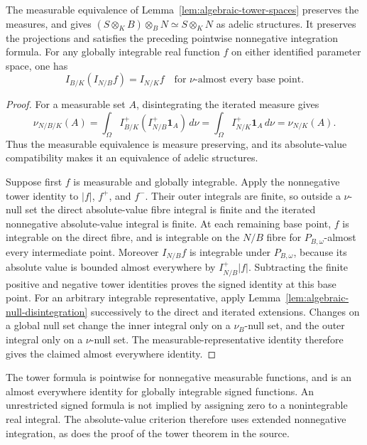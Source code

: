 \begin{theorem}\label{thm:algebraic-tower}
\leanok
{}
The measurable equivalence of Lemma~\ref{lem:algebraic-tower-spaces}
preserves the measures, and gives
$(S\otimes_K B)\otimes_B N\simeq S\otimes_K N$ as adelic structures.
It preserves the projections and satisfies the preceding pointwise
nonnegative integration formula. For any globally integrable real
function $f$ on either identified parameter space, one has
\[
 I_{B/K}(I_{N/B}f)=I_{N/K}f
 \quad\text{for }\nu\text{-almost every base point}.
\]
\end{theorem}
\begin{proof}
For a measurable set $A$, disintegrating the iterated measure gives
\[
 \nu_{N/B/K}(A)
 =\int_\Omega I^+_{B/K}(I^+_{N/B}\mathbf1_A)\,d\nu
 =\int_\Omega I^+_{N/K}\mathbf1_A\,d\nu=\nu_{N/K}(A).
\]
Thus the measurable equivalence is measure preserving, and its
absolute-value compatibility makes it an equivalence of adelic structures.

Suppose first $f$ is measurable and globally integrable. Apply the
nonnegative tower identity to $|f|$, $f^+$, and $f^-$. Their outer
integrals are finite, so outside a $\nu$-null set the direct
absolute-value fibre integral is finite and the iterated nonnegative
absolute-value integral is finite. At each remaining base point,
$f$ is integrable on the direct fibre, and is integrable on the
$N/B$ fibre for $P_{B,\omega}$-almost every intermediate point.
Moreover $I_{N/B}f$ is integrable under $P_{B,\omega}$, because its
absolute value is bounded almost everywhere by $I^+_{N/B}|f|$.
Subtracting the finite positive and negative tower identities proves
the signed identity at this base point.
For an arbitrary integrable representative, apply
Lemma~\ref{lem:algebraic-null-disintegration} successively to the
direct and iterated extensions. Changes on a global null set change
the inner integral only on a $\nu_B$-null set, and the outer integral
only on a $\nu$-null set. The measurable-representative identity
therefore gives the claimed almost everywhere identity.
\end{proof}

\begin{remark}\label{rem:signed-tower-domain}
The tower formula is pointwise for nonnegative measurable functions,
and is an almost everywhere identity for globally integrable signed
functions. An unrestricted signed formula is not implied by assigning
zero to a nonintegrable real integral. The absolute-value criterion
therefore uses extended nonnegative integration, as does the proof of
the tower theorem in the source.
\end{remark}
